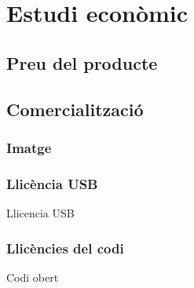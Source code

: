\chapter{Estudi econòmic}
\label{cap:economia}

\section{Preu del producte}
\section{Comercialització}
\subsection{Imatge}
\subsection{Llicència USB}
Llicencia USB
\subsection{Llicències del codi}
Codi obert
